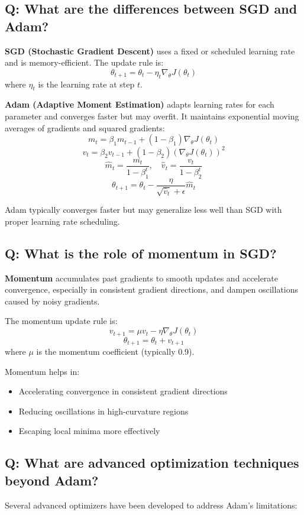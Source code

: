 \subsection*{Q: What are the differences between SGD and Adam?}
\textbf{SGD (Stochastic Gradient Descent)} uses a fixed or scheduled learning rate and is memory-efficient. The update rule is:
\[
\theta_{t+1} = \theta_t - \eta_t \nabla_\theta J(\theta_t)
\]
where \(\eta_t\) is the learning rate at step \(t\).

\textbf{Adam (Adaptive Moment Estimation)} adapts learning rates for each parameter and converges faster but may overfit. It maintains exponential moving averages of gradients and squared gradients:
\[
m_t = \beta_1 m_{t-1} + (1-\beta_1) \nabla_\theta J(\theta_t)
\]
\[
v_t = \beta_2 v_{t-1} + (1-\beta_2) (\nabla_\theta J(\theta_t))^2
\]
\[
\hat{m}_t = \frac{m_t}{1-\beta_1^t}, \quad \hat{v}_t = \frac{v_t}{1-\beta_2^t}
\]
\[
\theta_{t+1} = \theta_t - \frac{\eta}{\sqrt{\hat{v}_t} + \epsilon} \hat{m}_t
\]

Adam typically converges faster but may generalize less well than SGD with proper learning rate scheduling.

\subsection*{Q: What is the role of momentum in SGD?}
\textbf{Momentum} accumulates past gradients to smooth updates and accelerate convergence, especially in consistent gradient directions, and dampen oscillations caused by noisy gradients.

The momentum update rule is:
\[
v_{t+1} = \mu v_t - \eta \nabla_\theta J(\theta_t)
\]
\[
\theta_{t+1} = \theta_t + v_{t+1}
\]
where \(\mu\) is the momentum coefficient (typically 0.9).

Momentum helps in:
\begin{itemize}
	\item Accelerating convergence in consistent gradient directions
	\item Reducing oscillations in high-curvature regions
	\item Escaping local minima more effectively
\end{itemize}

\subsection*{Q: What are advanced optimization techniques beyond Adam?}
Several advanced optimizers have been developed to address Adam's limitations:

